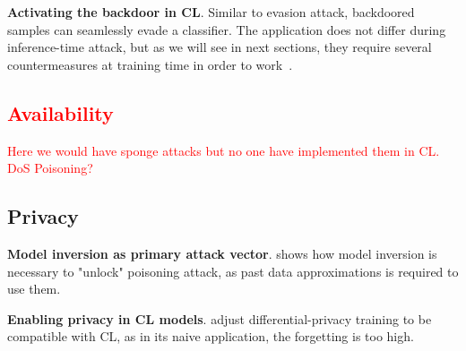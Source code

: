 \documentclass[5p,times]{elsarticle}
\newcommand{\myparagraph}[1]{\noindent \textbf{#1}.}
\begin{document}
\myparagraph{Activating the backdoor in CL}
Similar to evasion attack, backdoored samples can seamlessly evade a classifier. The application does not differ during inference-time attack, but as we will see in next sections, they require several countermeasures at training time in order to work~\cite{Jiang-TDSC2024, Gao-NeuralNetworks2025, Guo-USENIX2025, Nguyen-AAAI2025}.

\subsection{\textcolor{red}{Availability}}
\textcolor{red}{Here we would have sponge attacks but no one have implemented them in CL. DoS Poisoning?}

\subsection{Privacy}
\myparagraph{Model inversion as primary attack vector}
\cite{Du-IJCNN2023} shows how model inversion is necessary to "unlock" poisoning attack, as past data approximations is required to use them.

\myparagraph{Enabling privacy in CL models}
\cite{Hassanpour-IEEEAccess2022} adjust differential-privacy training to be compatible with CL, as in its naive application, the forgetting is too high.






\end{document}
